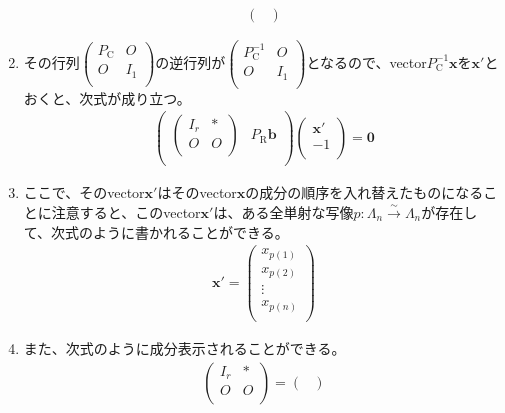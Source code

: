 \documentclass[dvipdfmx]{jsarticle}
\begin{document}
\begin{thm}
\begin{enumerate}
\begin{align*}
\begin{pmatrix}
\end{pmatrix}
\end{align*}
\item
  その行列$\begin{pmatrix}
  P_{\mathrm{C}} & O \\
  O & I_{1} \\
  \end{pmatrix}$の逆行列が$\begin{pmatrix}
  P_{\mathrm{C}}^{- 1} & O \\
  O & I_{1} \\
  \end{pmatrix}$となるので、vector$P_{\mathrm{C}}^{- 1}\mathbf{x}$を$\mathbf{x}'$とおくと、次式が成り立つ。
\begin{align*}
\begin{pmatrix}
\begin{pmatrix}
I_{r} & * \\
O & O \\
\end{pmatrix} & P_{\mathrm{R}}\mathbf{b} \\
\end{pmatrix}\begin{pmatrix}
\mathbf{x}' \\
 - 1 \\
\end{pmatrix} = \mathbf{0}
\end{align*}
\item
  ここで、そのvector$\mathbf{x}'$はそのvector$\mathbf{x}$の成分の順序を入れ替えたものになることに注意すると、このvector$\mathbf{x}'$は、ある全単射な写像$p:\varLambda_{n}\overset{\sim}{\rightarrow}\varLambda_{n}$が存在して、次式のように書かれることができる。
\begin{align*}
\mathbf{x}' = \begin{pmatrix}
x_{p(1)} \\
x_{p(2)} \\
 \vdots \\
x_{p(n)} \\
\end{pmatrix}
\end{align*}
\item
  また、次式のように成分表示されることができる。
\begin{align*}
\begin{pmatrix}
I_{r} & * \\
O & O \\
\end{pmatrix} = \begin{pmatrix}

\end{pmatrix}
\end{align*}
\end{enumerate}
\end{thm}
\end{document}
